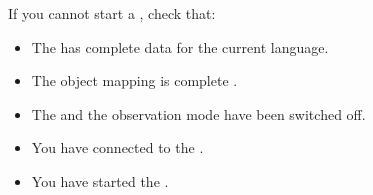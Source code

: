 % 
%
%
If you cannot start a \gdsuite{}, check that:
\begin{itemize}
\item The \gdsuite{} has complete data for the current language.  
\item The object mapping is complete .
\item The \gdomm{} and the observation mode have been switched off. 
\item You have connected to the \gdagent{} . 
\item You have started the \gdaut{} . 
 \end{itemize}
 




